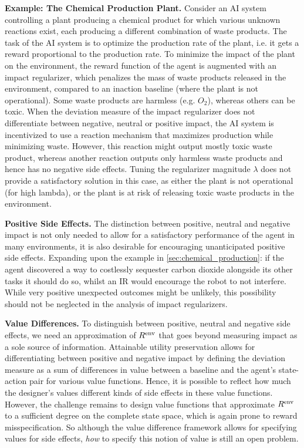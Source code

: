 \documentclass[letterpaper]{article} %
\newcommand{\Rframe}{R^{\textnormal{env}}}
\newcommand{\statement}[1]{\textbf{#1}}
\begin{document}
\statement{Example: The Chemical Production Plant.}
\label{sec:chemical_production}
Consider an AI system controlling a plant producing a chemical product for which various unknown reactions exist, each producing a different combination of waste products. The task of the AI system is to optimize the production rate of the plant, i.e. it gets a reward proportional to the production rate. To minimize the impact of the plant on the environment, the reward function of the agent is augmented with an impact regularizer, which penalizes the mass of waste products released in the environment, compared to an inaction baseline (where the plant is not operational). Some waste products are harmless (e.g. $O_2$), whereas others can be toxic. When the deviation measure of the impact regularizer does not differentiate between negative, neutral or positive impact, the AI system is incentivized to use a reaction mechanism that maximizes production while minimizing waste. However, this reaction might output mostly toxic waste product, whereas another reaction outputs only harmless waste products and hence has no negative side effects. Tuning the regularizer magnitude $\lambda$ does not provide a satisfactory solution in this case, as either the plant is not operational (for high lambda), or the plant is at risk of releasing toxic waste products in the environment.


\statement{Positive Side Effects.}
The distinction between positive, neutral and negative impact is not only needed to allow for a satisfactory performance of the agent in many environments, it is also desirable for encouraging unanticipated positive side effects. Expanding upon the example in \ref{sec:chemical_production}: if the agent discovered a way to costlessly sequester carbon dioxide alongside its other tasks it should do so, whilst an IR would encourage the robot to not interfere.
While very positive unexpected outcomes might be unlikely, this possibility should not be neglected in the analysis of impact regularizers. 

\statement{Value Differences.}
To distinguish between positive, neutral and negative side effects, we need an approximation of $\Rframe$ that goes beyond measuring impact as a sole source of information. Attainable utility preservation \citep{turner2020conservative} allows for differentiating between positive and negative impact by defining the deviation measure as a sum of differences in value between a baseline and the agent's state-action pair for various value functions. Hence, it is possible to reflect how much the designer's values different kinds of side effects in these value functions.
However, the challenge remains to design value functions that approximate $\Rframe$ to a sufficient degree on the complete state space, which is again prone to reward misspecification. So although the value difference framework allows for specifying values for side effects, \emph{how} to specify this notion of value is still an open problem. 
\end{document}
